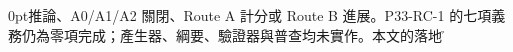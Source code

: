 \documentclass[11pt,a4paper]{article}
\begin{document}
{{0pt}推\hspace{0pt}論\hspace{0pt}、A0/A1/A2 關\hspace{0pt}閉\hspace{0pt}、Route A 計\hspace{0pt}分\hspace{0pt}或\hspace{0pt} Route B 進\hspace{0pt}展\hspace{0pt}。P33-RC-1 的\hspace{0pt}七\hspace{0pt}項\hspace{0pt}義\hspace{0pt}務\hspace{0pt}仍\hspace{0pt}為\hspace{0pt}零\hspace{0pt}項\hspace{0pt}完\hspace{0pt}成\hspace{0pt}；產\hspace{0pt}生\hspace{0pt}器\hspace{0pt}、綱\hspace{0pt}要\hspace{0pt}、驗\hspace{0pt}證\hspace{0pt}器\hspace{0pt}與\hspace{0pt}普\hspace{0pt}查\hspace{0pt}均\hspace{0pt}未\hspace{0pt}實\hspace{0pt}作\hspace{0pt}。本\hspace{0pt}文\hspace{0pt}的\hspace{0pt}落\hspace{0pt}地\hspace{0pt}成\h}
\end{document}
